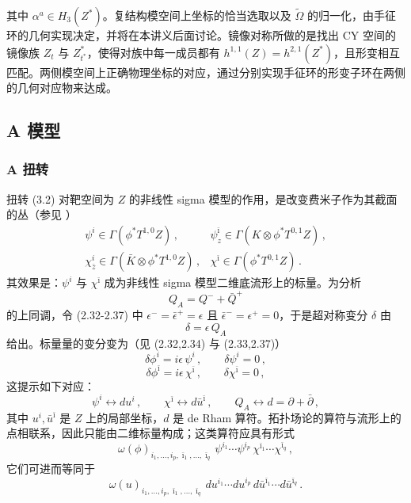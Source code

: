 
其中 $\alpha^{a}\in H_3(Z^{*})$。复结构模空间上坐标的恰当选取以及 $\tilde\Omega$ 的归一化，由手征环的几何实现决定，并将在本讲义后面讨论。镜像对称所做的是找出 CY 空间的镜像族 $Z_t$ 与 $Z^{*}_{t^{*}}$，使得对族中每一成员都有 $h^{1,1}(Z)=h^{2,1}(Z^{*})$，且形变相互匹配。两侧模空间上正确物理坐标的对应，通过分别实现手征环的形变子环在两侧的几何对应物来达成。

\subsection{A 模型}
\label{sec:3.4}

\subsubsection{A 扭转}
\label{sec:3.4.1}

扭转 (3.2) 对靶空间为 $Z$ 的非线性 sigma 模型的作用，是改变费米子作为其截面的丛（参见 \cite{ref6,ref9,ref10}）
\begin{equation}\tag{3.8}
\begin{array}{ll}
\psi^{i}\in\Gamma(\phi^{*}T^{1,0}Z)\,, & \psi^{\bar\imath}_{z}\in\Gamma(K\otimes\phi^{*}T^{0,1}Z)\,,\\[5pt]
\chi^{i}_{\bar z}\in\Gamma(\bar K\otimes\phi^{*}T^{1,0}Z)\,, & \chi^{\bar\imath}\in\Gamma(\phi^{*}T^{0,1}Z)\,.
\end{array}
\end{equation}
其效果是：$\psi^{i}$ 与 $\chi^{\bar\imath}$ 成为非线性 sigma 模型二维底流形上的标量。为分析
\[
Q_A=Q^{-}+\bar Q^{+}
\]
的上同调，令 (2.32-2.37) 中 $\epsilon^{-}=\bar\epsilon^{+}=\epsilon$ 且 $\bar\epsilon^{-}=\epsilon^{+}=0$，于是超对称变分 $\delta$ 由
\[
\delta=\epsilon\,Q_A
\]
给出。标量量的变分变为（见 (2.32,2.34) 与 (2.33,2.37)）
\begin{equation}\tag{3.9}
\delta\phi^{i}=i\epsilon\,\psi^{i}\,,\qquad \delta\psi^{i}=0\,,
\end{equation}
\begin{equation}\tag{3.10}
\delta\phi^{\bar\imath}=i\epsilon\,\chi^{\bar\imath}\,,\qquad \delta\chi^{\bar\imath}=0\,,
\end{equation}
这提示如下对应：
\begin{equation}\tag{3.11}
\psi^{i}\leftrightarrow du^{i}\,,\qquad
\chi^{\bar\imath}\leftrightarrow d\bar u^{\bar\imath}\,,\qquad
Q_A\leftrightarrow d=\partial+\bar\partial\,,
\end{equation}
其中 $u^{i},\bar u^{\bar\imath}$ 是 $Z$ 上的局部坐标，$d$ 是 de Rham 算符。拓扑场论的算符与流形上的点相联系，因此只能由二维标量构成；这类算符应具有形式
\begin{equation}\tag{3.12}
\omega(\phi)_{i_1,\ldots,i_p,\bar\imath_1,\ldots,\bar\imath_q}\,
\psi^{i_1}\cdots\psi^{i_p}\,\chi^{\bar\imath_1}\cdots\chi^{\bar\imath_q}\,,
\end{equation}
它们可进而等同于
\begin{equation}\tag{3.13}
\omega(u)_{i_1,\ldots,i_p,\bar\imath_1,\ldots,\bar\imath_q}\,
du^{i_1}\cdots du^{i_p}\,d\bar u^{\bar\imath_1}\cdots d\bar u^{\bar\imath_q}\,.
\end{equation}


